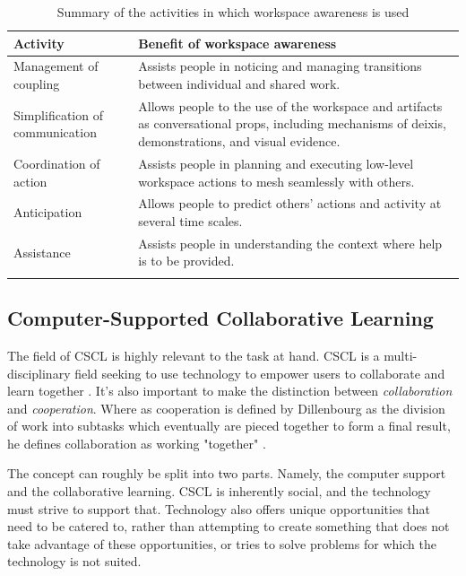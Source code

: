 \begin{table}[!h]
      \centering
        \caption{Summary of the activities in which workspace awareness is used}
        \begin{tabularx}{\textwidth}{l X}
        \toprule
        Activity & Benefit of workspace awareness \\
        \midrule
        \vspace{0.2cm}
        Management of coupling & Assists people in noticing and managing transitions between individual and shared work.\\
        \vspace{0.2cm}
        Simplification of communication & Allows people to the use of the workspace and artifacts as conversational props, including mechanisms of deixis, demonstrations, and visual evidence.\\\vspace{0.2cm}
        Coordination of action & Assists people in planning and executing low-level workspace actions to mesh seamlessly with others.\\\vspace{0.2cm}
        Anticipation & Allows people to predict others’ actions and activity at several time scales.\\\vspace{0.2cm}
        Assistance & Assists people in understanding the context where help is to be provided.\\
        \bottomrule
        \label{table:awarenessActivity}
        \end{tabularx}
\end{table}



\subsection{Computer-Supported Collaborative Learning} \label{CSCL}
\label{section:CSCL}
The field of CSCL is highly relevant to the task at hand. CSCL is a multi-disciplinary field seeking to use technology to empower users to collaborate and learn together \cite{stahl2006computer}.  It's also important to make the distinction between \textit{collaboration} and \textit{cooperation}. Where as cooperation is defined by Dillenbourg as the division of work into subtasks which eventually are pieced together to form a final result, he defines collaboration as working "together" \cite{dillenbourg1999you}.

The concept can roughly be split into two parts. Namely, the computer support and the collaborative learning. CSCL is inherently social, and the technology must strive to support that. Technology also offers unique opportunities that need to be catered to, rather than attempting to create something that does not take advantage of these opportunities, or tries to solve problems for which the technology is not suited.


